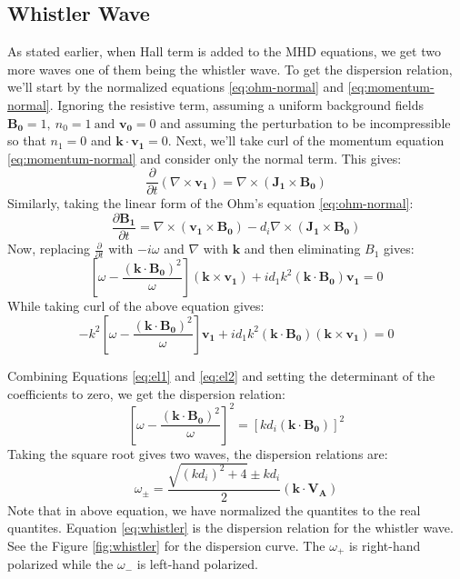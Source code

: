 \documentclass[12pt]{article}
\newenvironment{changemargin}[2]{%
\begin{list}{}{%
\setlength{\topsep}{0pt}%
\setlength{\leftmargin}{#1}%
\setlength{\rightmargin}{#2}%
\setlength{\listparindent}{\parindent}%
\setlength{\itemindent}{\parindent}%
\setlength{\parsep}{\parskip}%
}%
\item[]}{\end{list}}
\begin{document}
\begin{changemargin}{-2cm}{-2cm}
    \subsection{Whistler Wave}
    As stated earlier, when Hall term is added to the MHD equations, we get two more waves one of them being the whistler wave. To get the dispersion relation, we'll start by the normalized equations \ref{eq:ohm-normal} and \ref{eq:momentum-normal}. Ignoring the resistive term, assuming a uniform background fields $\mathbf{B_0} = 1, \: n_0 = 1 \: \text{and } \mathbf{v_0} = 0$ and assuming the perturbation to be incompressible so that $n_1=0$ and $\mathbf{k \cdot v_1} = 0$. Next, we'll take curl of the momentum equation \ref{eq:momentum-normal} and consider only the normal term. This gives:
    \begin{equation}
        \frac{\partial}{\partial t}(\nabla \times \mathbf{v_1}) = \nabla \times (\mathbf{J_1\times B_0})
    \end{equation}
    Similarly, taking the linear form of the Ohm's equation \ref{eq:ohm-normal}:
    \begin{equation}
        \frac{\partial \mathbf{B_1}}{\partial t} = \nabla \times \left(\mathbf{v_1\times B_0}\right)-d_i\nabla \times \left(\mathbf{J_1\times B_0}\right)
    \end{equation}
    Now, replacing $\frac{\partial}{\partial t}$ with $-i\omega$ and $\nabla$ with $\mathbf{k}$ and then eliminating $B_1$ gives:
    \begin{equation}\label{eq:el1}
        \left[\omega - \frac{(\mathbf{k \cdot B_0})^2}{\omega} \right](\mathbf{k \times v_1}) + id_1k^2(\mathbf{k \cdot B_0})\mathbf{v_1} = 0
    \end{equation}
    While taking curl of the above equation gives:
    \begin{equation}\label{eq:el2}
        -k^2\left[\omega - \frac{(\mathbf{k \cdot B_0})^2}{\omega} \right]\mathbf{v_1} + id_1k^2(\mathbf{k \cdot B_0})(\mathbf{k \times v_1}) = 0
    \end{equation}

    Combining Equations \ref{eq:el1} and \ref{eq:el2} and setting the determinant of the coefficients to zero, we get the dispersion relation:
    \begin{equation}
        \left[\omega - \frac{(\mathbf{k \cdot B_0})^2}{\omega} \right]^2 = \left[kd_i(\mathbf{k \cdot B_0})\right]^2
    \end{equation}
    Taking the square root gives two waves, the dispersion relations are:
    \begin{equation}\label{eq:whistler}
        \omega_{\pm} = \frac{\sqrt{(kd_i)^2+4}\pm kd_i}{2}(\mathbf{k \cdot V_A})
    \end{equation}
    Note that in above equation, we have normalized the quantites to the real quantites. Equation \ref{eq:whistler} is the dispersion relation for the whistler wave. See the Figure \ref{fig:whistler} for the dispersion curve. The $\omega_+$ is right-hand polarized while the $\omega_-$ is left-hand polarized.


\end{changemargin}
\end{document}
